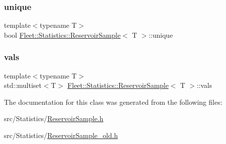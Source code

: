 \subsubsection{\texorpdfstring{unique}{unique}}
{\footnotesize\ttfamily template$<$typename T$>$ \\
bool \hyperlink{class_fleet_1_1_statistics_1_1_reservoir_sample}{Fleet\+::\+Statistics\+::\+Reservoir\+Sample}$<$ T $>$\+::unique}

\mbox{\label{class_fleet_1_1_statistics_1_1_reservoir_sample_a9ffdb177a62651a2280099553124c433}} 
\subsubsection{\texorpdfstring{vals}{vals}}
{\footnotesize\ttfamily template$<$typename T$>$ \\
std\+::multiset$<$T$>$ \hyperlink{class_fleet_1_1_statistics_1_1_reservoir_sample}{Fleet\+::\+Statistics\+::\+Reservoir\+Sample}$<$ T $>$\+::vals}



The documentation for this class was generated from the following files\+:\begin{DoxyCompactItemize}
\item 
src/\+Statistics/\hyperlink{_reservoir_sample_8h}{Reservoir\+Sample.\+h}\item 
src/\+Statistics/\hyperlink{_reservoir_sample__old_8h}{Reservoir\+Sample\+\_\+old.\+h}\end{DoxyCompactItemize}
